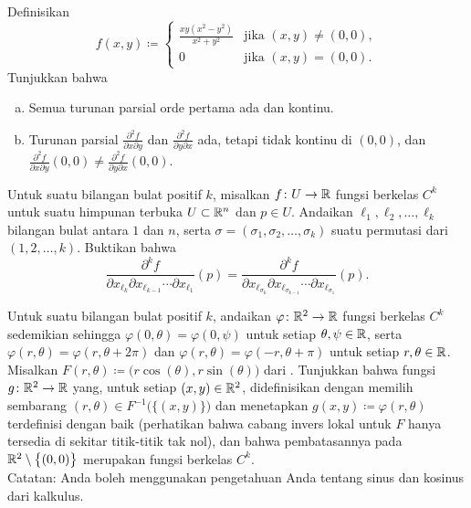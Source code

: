 \begin{exercise} \label{exercise:mixedpartialsunequal}
Definisikan
\begin{equation*}
f(x,y) \coloneqq
\begin{cases}
\frac{xy(x^2-y^2)}{x^2+y^2} & \text{jika } (x,y) \neq (0,0),\\
0                           & \text{jika } (x,y) = (0,0).
\end{cases}
\end{equation*}
Tunjukkan bahwa
\begin{enumerate}[a)]
\item
Semua turunan parsial orde pertama ada dan kontinu.
\item
Turunan parsial
$\frac{\partial^2 f}{\partial x \partial y}$ dan
$\frac{\partial^2 f}{\partial y \partial x}$ ada, tetapi tidak kontinu
di $(0,0)$, dan
$\frac{\partial^2 f}{\partial x \partial y}(0,0) \neq 
\frac{\partial^2 f}{\partial y \partial x}(0,0)$.
\end{enumerate}
\end{exercise}

\begin{exercise}
Untuk suatu bilangan bulat positif $k$, misalkan $f \colon U \to {\mathbb{R}}$ fungsi berkelas $C^k$ untuk suatu himpunan terbuka $U \subset {\mathbb{R}}^n$
dan $p \in U$.
Andaikan ${\ell}_1,{\ell}_2,\ldots,{\ell}_k$ bilangan bulat antara $1$
dan $n$, serta $\sigma=(\sigma_1,\sigma_2,\ldots,\sigma_k)$ suatu
permutasi dari $(1,2,\ldots,k)$.  Buktikan bahwa
\begin{equation*}
\frac{\partial^{k} f}{\partial x_{{\ell}_{k}} \partial x_{{\ell}_{k-1}}
\cdots \partial x_{{\ell}_1}} (p)
=
\frac{\partial^{k} f}{\partial x_{{\ell}_{\sigma_k}} \partial
x_{{\ell}_{\sigma_{k-1}}}
\cdots \partial x_{{\ell}_{\sigma_1}}} (p) .
\end{equation*}
\end{exercise}

\begin{exercise}
Untuk suatu bilangan bulat positif $k$, andaikan $\varphi \colon {\mathbb{R}}^2 \to {\mathbb{R}}$ fungsi berkelas $C^k$
sedemikian sehingga
$\varphi(0,\theta) = \varphi(0,\psi)$ untuk setiap $\theta,\psi \in {\mathbb{R}}$,
serta
$\varphi(r,\theta) = \varphi(r,\theta+2\pi)$
dan
$\varphi(r,\theta) = \varphi(-r,\theta+\pi)$
untuk setiap $r,\theta \in {\mathbb{R}}$.
Misalkan $F(r,\theta) \coloneqq \bigl(r \cos(\theta), r \sin(\theta) \bigr)$ dari 
.  Tunjukkan bahwa fungsi
$g \colon {\mathbb{R}}^2 \to {\mathbb{R}}$ yang, untuk setiap $(x,y) \in {\mathbb{R}}^2$, didefinisikan dengan memilih sembarang
$(r,\theta) \in F^{-1}\bigl(\{(x,y)\}\bigr)$ dan menetapkan
$g(x,y) \coloneqq \varphi(r,\theta)$ terdefinisi dengan baik (perhatikan bahwa
cabang invers lokal untuk $F$ hanya tersedia di sekitar titik-titik tak nol), dan bahwa
pembatasannya pada ${\mathbb{R}}^2 \setminus \bigl\{ (0,0) \bigr\}$ merupakan fungsi berkelas $C^k$.
\\
Catatan: Anda boleh menggunakan pengetahuan Anda tentang sinus dan kosinus dari kalkulus.
\end{exercise}

